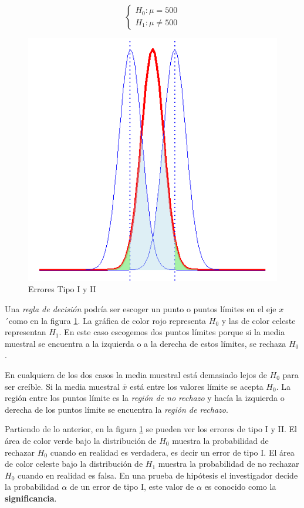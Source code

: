 \documentclass[letterpaper,]{book}
\begin{document}
\begin{equation} 
\begin{cases} 
H_0: \mu = 500 \\ 
H_1: \mu \neq 500
\end{cases} 
\end{equation}

\begin{figure}[h!]

{\centering \includegraphics[width=0.5\linewidth]{phtest} 

}

\caption{Errores Tipo I y II}\label{fig:pht}
\end{figure}

Una \emph{regla de decisión} podría ser escoger un punto o puntos límites en el eje \(x\)´como en la figura \ref{fig:pht}. La gráfica de color rojo representa \(H_0\) y las de color celeste representan \(H_1\). En este caso escogemos dos puntos límites porque si la media muestral se encuentra a la izquierda o a la derecha de estos límites, se rechaza \(H_0\).

En cualquiera de los dos casos la media muestral está demasiado lejos de \(H_0\) para ser creíble. Si la media muestral \(\bar{x}\) está entre los valores límite se acepta \(H_0\). La región entre los puntos límite es la \emph{región de no rechazo} y hacía la izquierda o derecha de los puntos límite se encuentra la \emph{región de rechazo}.

Partiendo de lo anterior, en la figura \ref{fig:pht} se pueden ver los errores de tipo I y II. El área de color verde bajo la distribución de \(H_0\) muestra la probabilidad de rechazar \(H_0\) cuando en realidad es verdadera, es decir un error de tipo I. El área de color celeste bajo la distribución de \(H_1\) muestra la probabilidad de no rechazar \(H_0\) cuando en realidad es falsa. En una prueba de hipótesis el investigador decide la probabilidad \(\alpha\) de un error de tipo I, este valor de \(\alpha\) es conocido como la \textbf{significancia}.
\end{document}
